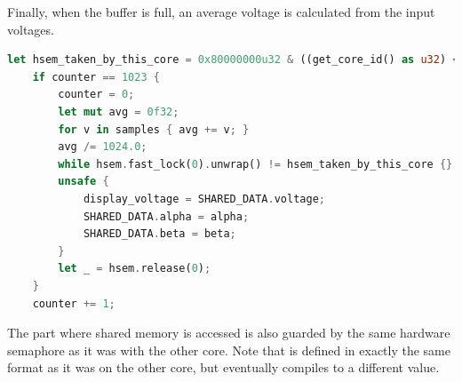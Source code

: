 Finally, when the buffer is full, an average voltage is calculated from the input voltages.

\begin{lstlisting}[language=Rust,frame=single,float=!ht,style=customrust,label={lst:avg-voltage},caption={Calculating the Average Voltage}]
    let hsem_taken_by_this_core = 0x80000000u32 & ((get_core_id() as u32) << 8);
    if counter == 1023 {
        counter = 0;
        let mut avg = 0f32;
        for v in samples { avg += v; }
        avg /= 1024.0;
        while hsem.fast_lock(0).unwrap() != hsem_taken_by_this_core {}
        unsafe {
            display_voltage = SHARED_DATA.voltage;
            SHARED_DATA.alpha = alpha;
            SHARED_DATA.beta = beta;
        }
        let _ = hsem.release(0);
    }
    counter += 1;
\end{lstlisting}

The part where shared memory is accessed is also guarded by the same hardware semaphore as it was with the other core. Note that  is defined in exactly the same format as it was on the other core, but eventually compiles to a different value.
